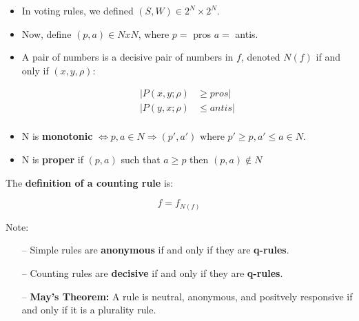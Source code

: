 \documentclass{article}
\begin{document}
\begin{itemize}

\item In voting rules, we defined $(S,W) \in 2^N \times 2^N$.
 
\item Now, define $(p,a) \in NxN$, where $p=$ pros $a=$ antis.

\item  A pair of numbers is a decisive pair of numbers in $f$, denoted $N(f)$ if and only if $(x,y,\rho) $:

\begin{align*}
|P(x,y;\rho) &\geq pros|\\ %
|P(y,x;\rho) &\leq antis|\\
\end{align*}

\item N is \textbf{monotonic} $\Leftrightarrow p,a \in N \Rightarrow (p',a') \text{ where } p'\geq p, a' \leq a \in N$.
\item N is \textbf{proper} if $(p,a)$ such that $a\geq p$ then $(p,a) \not \in N$ 






\end{itemize}

The \textbf{definition of a counting rule} is:

\[
f=f_{N{(f)}}
\]

Note: 
\begin{itemize}

\item [--] Simple rules are \textbf{anonymous} if and only if they are \textbf{q-rules}.

\item [--]Counting rules are \textbf{decisive} if and only if they are \textbf{q-rules}.
\item [--] \textbf{May's Theorem:} A rule is neutral, anonymous, and positvely responsive if and only if it is a plurality rule.
\end{itemize}
\end{document}
